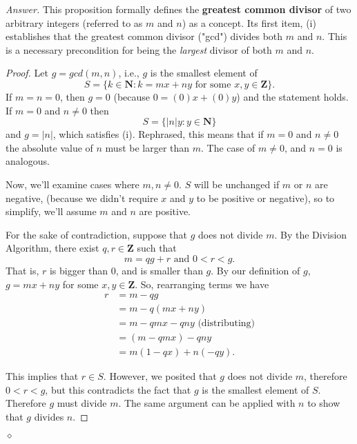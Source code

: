 \documentclass[12pt,oneside]{amsart}
\theoremstyle{remark}
\newcommand{\bfN}{\mathbf{N}}
\newcommand{\bfZ}{\mathbf{Z}}
\newenvironment{answer}{\bigskip\noindent\emph{Answer.}}{\hfill$\diamond$\newline}
\begin{document}
\begin{answer}
This proposition formally defines the \textbf{greatest common divisor} of two arbitrary integers (referred to as $m$ and $n$) as a concept. Its first item, (i) establishes that the greatest common divisor ("gcd") divides both $m$ and $n$. This is a necessary precondition for being the \emph{largest} divisor of both $m$ and $n$.
\begin{proof}
Let $g = gcd(m, n)$, i.e., $g$ is the smallest element of \[ S = \{k \in \bfN : k = mx + ny \text{ for some } x,y \in \bfZ \}. \] If $m = n = 0$, then $g = 0$ (because $0 = (0)x + (0)y$) and the statement holds. If $m = 0$ and $n \neq 0$ then \[ S = \{ |n|y : y \in \bfN \} \] and $g = |n|$, which satisfies (i). Rephrased, this means that if $m = 0$ and $n \neq 0$ the absolute value of $n$ must be larger than $m$. The case of $m \neq 0$, and $n = 0$ is analogous.

Now, we'll examine cases where $m,n \neq 0$. $S$ will be unchanged if $m$ or $n$ are negative, (because we didn't require $x$ and $y$ to be positive or negative), so to simplify, we'll assume $m$ and $n$ are positive.

For the sake of contradiction, suppose that $g$ does not divide $m$. By the Division Algorithm, there exist $q,r \in \bfZ$ such that \[ m = qg + r \text{ and } 0 < r < g. \] That is, $r$ is bigger than 0, and is smaller than $g$. By our definition of $g$, $g = mx + ny$ for some $x,y \in \bfZ$. So, rearranging terms we have
\begin{equation}
\begin{split}
r &= m - qg \\
  &= m - q(mx + ny) \\
  &= m - qmx - qny \text{ (distributing)} \\
  &= (m - qmx) - qny \\
  &= m(1 - qx) + n(-qy).
\end{split}
\end{equation}

This implies that $r \in S$. However, we posited that $g$ does not divide $m$, therefore $0 < r < g$, but this contradicts the fact that $g$ is the smallest element of $S$. Therefore $g$ must divide $m$. The same argument can be applied with $n$ to show that $g$ divides $n$.
\end{proof}
\end{answer}
\end{document}
